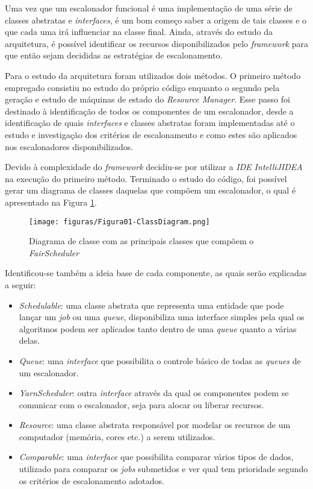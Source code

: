 Uma vez que um escalonador funcional é uma implementação de uma série de classes abstratas e \emph{interfaces}, é um bom começo saber a origem de tais classes e o que cada uma irá influenciar na classe final. Ainda, através do estudo da arquitetura, é possível identificar os recursos disponibilizados pelo \emph{framework} para que então sejam decididas as estratégias de escalonamento.

Para o estudo da arquitetura foram utilizados dois métodos. O primeiro método empregado consistiu no estudo do próprio código enquanto o segundo pela geração e estudo de máquinas de estado do \emph{Resource Manager}. Esse passo foi destinado à identificação de todos os componentes de um escalonador, desde a identificação de quais \emph{interfaces} e classes abstratas foram implementadas até o estudo e investigação dos critérios de escalonamento e como estes são aplicados nos escalonadores disponibilizados.

Devido à complexidade do \emph{framework} decidiu-se por utilizar a \emph{IDE IntelliJIDEA} \cite{IDEA} na execução do primeiro método. Terminado o estudo do código, foi possível gerar um diagrama de classes daquelas que compõem um escalonador, o qual é apresentado na Figura \ref{fig:Diagrama de Classes}.

\begin{figure}[hbtn]
   \centering
   \texttt{[image: figuras/Figura01-ClassDiagram.png]}
   \caption{Diagrama de classe com as principais classes que compõem o \emph{FairScheduler}}
   \label{fig:Diagrama de Classes}
\end{figure}

Identificou-se também a ideia base de cada componente, as quais serão explicadas a seguir:

\begin{itemize}
	\item \emph{Schedulable}: uma classe abstrata que representa uma entidade que pode lançar um \emph{job} ou uma \emph{queue}, disponibiliza uma interface simples pela qual os algoritmos podem ser aplicados tanto dentro de uma \emph{queue} quanto a várias delas.
	\item \emph{Queue}: uma \emph{interface} que possibilita o controle básico de todas as \emph{queues} de um escalonador.
	\item \emph{YarnScheduler}: outra \emph{interface} através da qual os componentes podem se comunicar com o escalonador, seja para alocar ou liberar recursos.
	\item \emph{Resource}: uma classe abstrata responsável por modelar os recursos de um computador (memória, cores etc.) a serem utilizados.
	\item \emph{Comparable}: uma \emph{interface} que possibilita comparar vários tipos de dados, utilizado para comparar os \emph{jobs} submetidos e ver qual tem prioridade segundo os critérios de escalonamento adotados.
\end{itemize}

